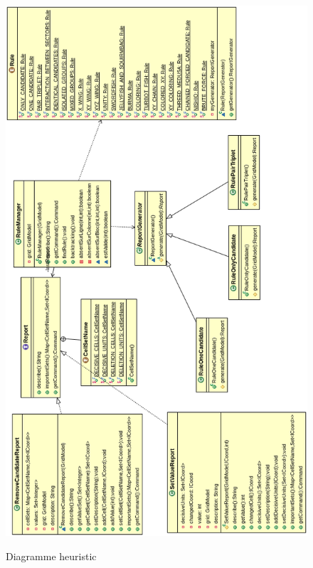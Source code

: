 \begin{figure}[ht]
  \caption{\label{annexe18} Diagramme heuristic}
  \includegraphics [width=140mm]{images/heuristic.png} \\[0.5cm]
\end{figure}



